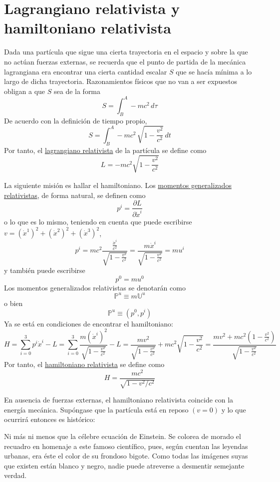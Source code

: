 \documentclass[12pt]{report}
\begin{document}
\section{Lagrangiano relativista y hamiltoniano relativista}

Dada una partícula que sigue una cierta trayectoria en el espacio y sobre la que no actúan fuerzas externas, se recuerda que el punto de partida de la mecánica lagrangiana era encontrar una cierta cantidad escalar $S$ que se hacía mínima a lo largo de dicha trayectoria. Razonamientos físicos que no van a ser expuestos obligan a que $S$ sea de la forma
\[S = \int_B^A -mc^2 \, d\tau\]
De acuerdo con la definición de tiempo propio,
\[S = \int_B^A -mc^2 \, \sqrt{1-\frac{v^2}{c^2}} \, dt\]
Por tanto, el \ul{lagrangiano relativista} de la partícula se define como
\[\boxed{\underset{\phantom{\sum}}{L}  = -mc^2 \sqrt{1-\frac{v^2}{c^2}}}\]

\vspace{2mm}
La siguiente misión es hallar el hamiltoniano. Los \ul{momentos generalizados relativistas}, de forma natural, se definen como
\[p^i = \frac{\partial L}{\partial \dot{x}^i}\]
o lo que es lo mismo, teniendo en cuenta que puede escribirse $v = (\dot{x}^1)^2 + (\dot{x}^2)^2+(\dot{x}^3)^2$,
\[p^i = mc^2 \frac{\frac{\dot{x}^i}{c^2}}{\sqrt{1-\frac{v^2}{c^2}}} = \frac{m\dot{x}^i}{\sqrt{1-\frac{v^2}{c^2}}} = mu^i\]
y también puede escribirse
\[p^0 = mu^0\]
Los momentos generalizados relativistas se denotarán como
\[\mathbb{P}^u \equiv m\mathbb{U}^u\]
o bien
\[\mathbb{P}^u \equiv (p^0, p^i)\]
Ya se está en condiciones de encontrar el hamiltoniano:
\[H = \sum_{i=0}^3 p^i \dot{x}^i - L = \sum_{i=0}^3 \frac{m(\dot{x}^i)^2}{\sqrt{1-\frac{v^2}{c^2}}} - L = \frac{mv^2}{\sqrt{1-\frac{v^2}{c^2}}} + mc^2 \sqrt{1-\frac{v^2}{c^2}} = \frac{mv^2+mc^2(1-\frac{v^2}{c^2})}{\sqrt{1-\frac{v^2}{c^2}}}\]
Por tanto, el \ul{hamiltoniano relativista} se define como
\[\boxed{H = \frac{mc^2}{\sqrt{1-v^2/c^2}}}\]

En ausencia de fuerzas externas, el hamiltoniano relativista coincide con la energía mecánica. Supóngase que la partícula está en reposo $(v = 0)$ y lo que ocurrirá entonces es histórico:

\begin{center}
\end{center}

Ni más ni menos que la célebre ecuación de Einstein. Se colorea de morado el recuadro en homenaje a este famoso científico, pues, según cuentan las leyendas urbanas, era éste el color de su frondoso bigote. Como todas las imágenes suyas que existen están blanco y negro, nadie puede atreverse a desmentir semejante verdad.
\end{document}
